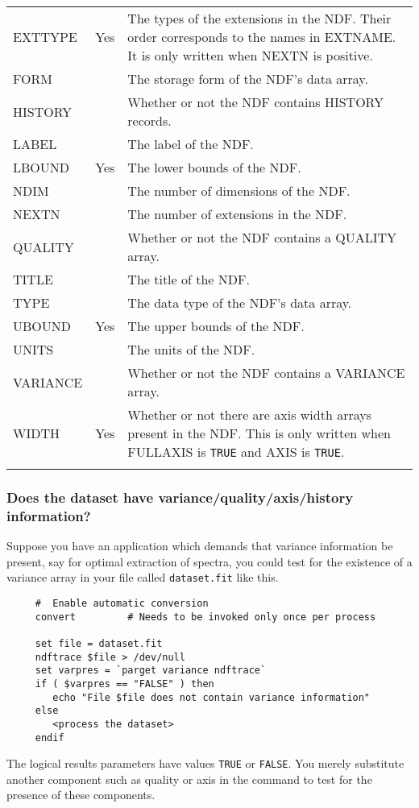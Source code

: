 \begin{center}
\begin{tabular}{lcp{112mm}}
EXTTYPE & Yes & The types of the extensions in the NDF.  Their order
                corresponds to the names in EXTNAME.  It is only written when
                NEXTN is positive. \\
FORM & & The storage form of the NDF's data array. \\
HISTORY & & Whether or not the NDF contains HISTORY records. \\
LABEL & & The label of the NDF. \\
LBOUND & Yes & The lower bounds of the NDF. \\
NDIM & & The number of dimensions of the NDF. \\
NEXTN & & The number of extensions in the NDF. \\
QUALITY & & Whether or not the NDF contains a QUALITY array. \\
TITLE & & The title of the NDF. \\
TYPE & & The data type of the NDF's data array. \\
UBOUND & Yes & The upper bounds of the NDF.\\
UNITS & & The units of the NDF. \\
VARIANCE & & Whether or not the NDF contains a VARIANCE array. \\
WIDTH & Yes & Whether or not there are axis width arrays present in
              the NDF.  This is only written when FULLAXIS is {\tt TRUE} and AXIS is
              {\tt TRUE}. \\ 
\\ \hline
\end{tabular}
\end{center}

\newpage
\subsubsection{Does the dataset have
variance/quality/axis/history information?\label{sc4_se_dataset_variance}}

Suppose you have an application which demands that variance information
be present, say for optimal extraction of spectra, you could test for
the existence of a variance array in your  file called {\tt dataset.fit} like this.

\small
\begin{verbatim}
     #  Enable automatic conversion
     convert         # Needs to be invoked only once per process
     
     set file = dataset.fit
     ndftrace $file > /dev/null
     set varpres = `parget variance ndftrace`
     if ( $varpres == "FALSE" ) then
        echo "File $file does not contain variance information"
     else
        <process the dataset>
     endif
\end{verbatim}
\normalsize
The logical results parameters have values {\tt TRUE} or {\tt FALSE}\@.
You merely substitute another component such as quality or axis in the
 command to test for the presence of
these components.

